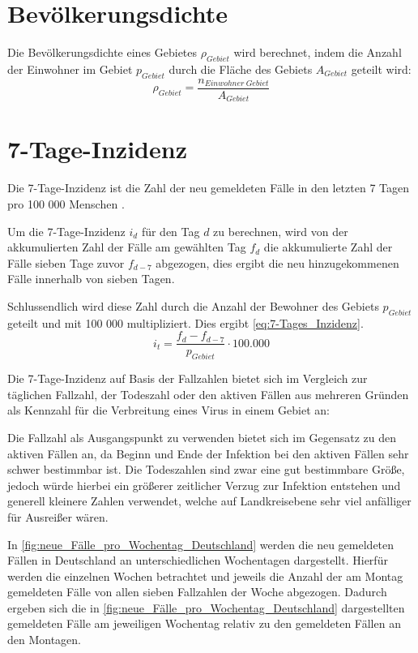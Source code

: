 \section{Bevölkerungsdichte}
Die Bevölkerungsdichte eines Gebietes $\rho_{Gebiet}$ wird berechnet, indem die Anzahl der Einwohner im Gebiet $p_{Gebiet}$ durch die Fläche des Gebiets $A_{Gebiet}$ geteilt wird:
\begin{equation}\label{eq:Bevölkerungsdichte}
    \rho_{Gebiet} = \frac{n_{Einwohner\  Gebiet}}{A_{Gebiet}}
\end{equation}
\section{7-Tage-Inzidenz}\label{sec:Grundlagen:7-Tages Inzidenz}
Die 7-Tage-Inzidenz ist die Zahl der neu gemeldeten Fälle in den letzten 7 Tagen pro 100 000 Menschen \autocite{7-TageInzidenz}.

Um die 7-Tage-Inzidenz $i_d$ für den Tag $d$ zu berechnen, wird von der akkumulierten Zahl der Fälle  am gewählten Tag $f_d$ die akkumulierte Zahl der Fälle sieben Tage zuvor $f_{d-7}$ abgezogen, dies ergibt die neu hinzugekommenen Fälle innerhalb von sieben Tagen.

Schlussendlich wird diese Zahl durch die Anzahl der Bewohner des Gebiets $p_{Gebiet}$ geteilt und mit 100 000 multipliziert. Dies ergibt \autoref{eq:7-Tages_Inzidenz}.
\begin{equation}\label{eq:7-Tages_Inzidenz}
    i_t= \frac{f_d-f_{d-7}}{p_{Gebiet}}\cdot 100.000
\end{equation}

Die 7-Tage-Inzidenz auf Basis der Fallzahlen bietet sich im Vergleich zur täglichen Fallzahl, der Todeszahl oder den aktiven Fällen aus mehreren Gründen als Kennzahl für die Verbreitung eines Virus in einem Gebiet an:

Die Fallzahl als Ausgangspunkt zu verwenden bietet sich im Gegensatz zu den aktiven Fällen an, da Beginn und Ende der Infektion bei den aktiven Fällen sehr schwer bestimmbar ist. Die Todeszahlen sind zwar eine gut bestimmbare Größe, jedoch würde hierbei ein größerer zeitlicher Verzug zur Infektion entstehen und generell kleinere Zahlen verwendet, welche auf Landkreisebene sehr viel anfälliger für Ausreißer wären.

In \autoref{fig:neue_Fälle_pro_Wochentag_Deutschland} werden die neu gemeldeten Fällen in Deutschland an unterschiedlichen Wochentagen dargestellt. Hierfür werden die einzelnen Wochen betrachtet und jeweils die Anzahl der am Montag gemeldeten Fälle von allen sieben Fallzahlen der Woche abgezogen. Dadurch ergeben sich die in \autoref{fig:neue_Fälle_pro_Wochentag_Deutschland} dargestellten gemeldeten Fälle am jeweiligen Wochentag relativ zu den gemeldeten Fällen an den Montagen.

